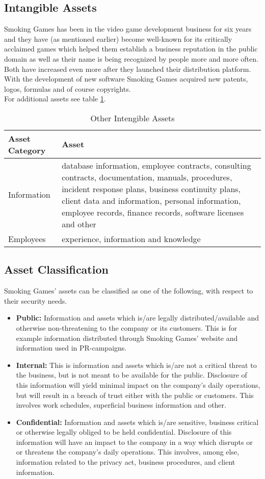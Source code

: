 \subsection{Intangible Assets}
Smoking Games has been in the video game development business for six years and they have (as mentioned earlier) become well-known for its critically acclaimed games which helped them establish a business reputation in the public domain as well as their name is being recognized by people more and more often. Both have increased even more after they launched their distribution platform.\\
With the development of new software Smoking Games acquired new patents, logos, formulas and of course copyrights.\\
For additional assets see table \ref{tab:OtherTangibleAssets}. 
\begin{table}[h]
	\centering
	\begin{tabular}{l | l}
		\textbf{Asset Category} & \textbf{Asset}\\\hline\hline
		Information & \parbox[t]{7cm}{database information, employee contracts, consulting contracts, documentation,
manuals, procedures, incident response plans, business continuity plans, client data and
information, personal information, employee records, finance records, software licenses
and other}\\\hline
		Employees & \parbox[t]{7cm}{experience, information and knowledge}
	\end{tabular}
	\caption{Other Intengible Assets}\label{tab:OtherTangibleAssets}
\end{table}
\subsection{Asset Classification}
Smoking Games' assets can be classified as one of the following, with respect to their security needs.\\
\medskip
\begin{itemize}
	\item \textbf{Public:} Information and assets which is/are legally distributed/available and otherwise non-threatening to the company or its customers. This is for example information distributed through Smoking Games' website and information used in PR-campaigns.
	\item \textbf{Internal:} This is information and assets which is/are not a critical threat to the business, but is not meant to be available for the public. Disclosure of this information will yield minimal impact on the company’s daily operations, but will result in a breach of trust either with the public or customers. This involves work schedules, superficial business information and other.
	\item \textbf{Confidential:} Information and assets which is/are sensitive, business critical or otherwise legally obliged to be held confidential. Disclosure of this information will have an impact to the company in a way which disrupts or or threatens the company’s daily operations. This involves, among else, information related to the privacy act, business procedures, and client information.
\end{itemize}